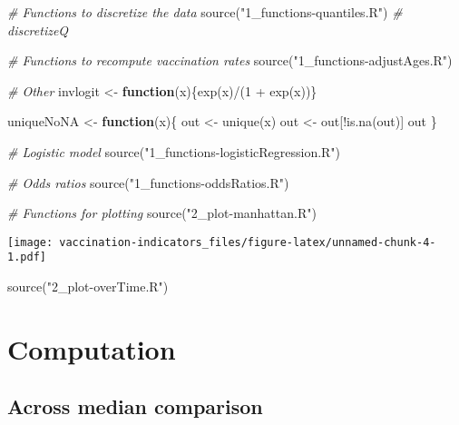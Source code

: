 \documentclass[
]{article}
\newenvironment{Shaded}{\begin{snugshade}}{\end{snugshade}}
\newcommand{\CommentTok}[1]{\textcolor[rgb]{0.56,0.35,0.01}{\textit{#1}}}
\newcommand{\ControlFlowTok}[1]{\textcolor[rgb]{0.13,0.29,0.53}{\textbf{#1}}}
\newcommand{\DecValTok}[1]{\textcolor[rgb]{0.00,0.00,0.81}{#1}}
\newcommand{\FunctionTok}[1]{\textcolor[rgb]{0.00,0.00,0.00}{#1}}
\newcommand{\NormalTok}[1]{#1}
\newcommand{\OtherTok}[1]{\textcolor[rgb]{0.56,0.35,0.01}{#1}}
\newcommand{\SpecialCharTok}[1]{\textcolor[rgb]{0.00,0.00,0.00}{#1}}
\newcommand{\StringTok}[1]{\textcolor[rgb]{0.31,0.60,0.02}{#1}}
\begin{document}
\begin{Shaded}
\begin{Highlighting}[]
\CommentTok{\# Functions to discretize the data}
\FunctionTok{source}\NormalTok{(}\StringTok{"1\_functions{-}quantiles.R"}\NormalTok{)}
\CommentTok{\# \textasciigrave{}discretizeQ\textasciigrave{}}

\CommentTok{\# Functions to recompute vaccination rates}
\FunctionTok{source}\NormalTok{(}\StringTok{"1\_functions{-}adjustAges.R"}\NormalTok{)}

\CommentTok{\# Other}
\NormalTok{invlogit }\OtherTok{\textless{}{-}} \ControlFlowTok{function}\NormalTok{(x)\{}\FunctionTok{exp}\NormalTok{(x)}\SpecialCharTok{/}\NormalTok{(}\DecValTok{1} \SpecialCharTok{+} \FunctionTok{exp}\NormalTok{(x))\}}

\NormalTok{uniqueNoNA }\OtherTok{\textless{}{-}} \ControlFlowTok{function}\NormalTok{(x)\{}
\NormalTok{  out }\OtherTok{\textless{}{-}} \FunctionTok{unique}\NormalTok{(x)}
\NormalTok{  out }\OtherTok{\textless{}{-}}\NormalTok{ out[}\SpecialCharTok{!}\FunctionTok{is.na}\NormalTok{(out)]}
\NormalTok{  out}
\NormalTok{\}}

\CommentTok{\# Logistic model}
\FunctionTok{source}\NormalTok{(}\StringTok{"1\_functions{-}logisticRegression.R"}\NormalTok{)}

\CommentTok{\# Odds ratios}
\FunctionTok{source}\NormalTok{(}\StringTok{"1\_functions{-}oddsRatios.R"}\NormalTok{)}

\CommentTok{\# Functions for plotting}
\FunctionTok{source}\NormalTok{(}\StringTok{"2\_plot{-}manhattan.R"}\NormalTok{)}
\end{Highlighting}
\end{Shaded}

\texttt{[image: vaccination-indicators\_files/figure-latex/unnamed-chunk-4-1.pdf]}

\begin{Shaded}
\begin{Highlighting}[]
\FunctionTok{source}\NormalTok{(}\StringTok{"2\_plot{-}overTime.R"}\NormalTok{)}
\end{Highlighting}
\end{Shaded}

\hypertarget{computation}{%
\section{Computation}\label{computation}}

\hypertarget{across-median-comparison}{%
\subsection{Across median comparison}\label{across-median-comparison}}
\end{document}
